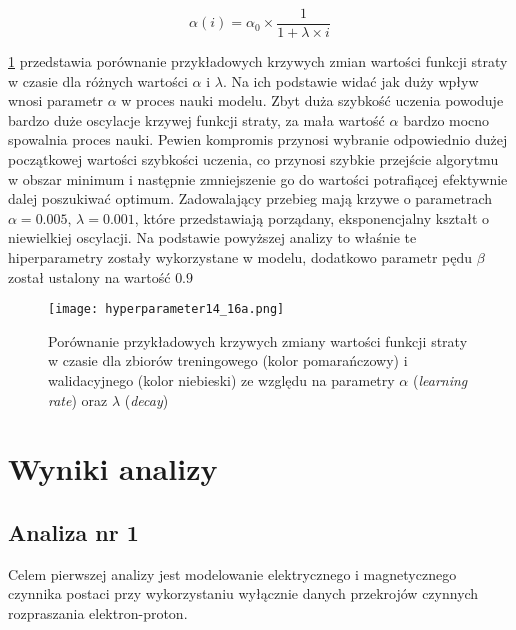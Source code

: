 \documentclass[11pt]{book}
\theoremstyle{definition}
\begin{document}
\begin{equation}
\alpha(i) = \alpha_0 \times \frac{1}{1 + \lambda \times i}
\end{equation}

\figurename{} \ref{fig:hyperparameters} przedstawia porównanie przykładowych krzywych zmian wartości funkcji straty w czasie dla różnych wartości $\alpha$ i $\lambda$. Na ich podstawie widać jak duży wpływ wnosi parametr $\alpha$ w proces nauki modelu. Zbyt duża szybkość uczenia powoduje bardzo duże oscylacje krzywej funkcji straty, za mała wartość $\alpha$ bardzo mocno spowalnia proces nauki. Pewien kompromis przynosi wybranie odpowiednio dużej początkowej wartości szybkości uczenia, co przynosi szybkie przejście algorytmu w obszar minimum i następnie zmniejszenie go do wartości potrafiącej efektywnie dalej poszukiwać optimum. Zadowalający przebieg mają krzywe o parametrach $\alpha = 0.005$, $\lambda = 0.001$, które przedstawiają porządany, eksponencjalny kształt o niewielkiej oscylacji. Na podstawie powyższej analizy to właśnie te hiperparametry zostały wykorzystane w modelu, dodatkowo parametr pędu $\beta$ został ustalony na wartość $0.9$


\begin{figure}[htp!]
	\centering
	\texttt{[image: hyperparameter14\_16a.png]}
	\caption{Porównanie przykładowych krzywych zmiany wartości funkcji straty w czasie dla zbiorów treningowego (kolor pomarańczowy) i walidacyjnego (kolor niebieski) ze względu na parametry $\alpha$ (\textit{learning rate}) oraz $\lambda$ (\textit{decay})}
	\label{fig:hyperparameters}
\end{figure}


\chapter{Wyniki analizy}

\section{Analiza nr 1}
%
Celem pierwszej analizy jest modelowanie elektrycznego i magnetycznego czynnika postaci przy wykorzystaniu wyłącznie danych przekrojów czynnych rozpraszania elektron-proton.

%
\end{document}
